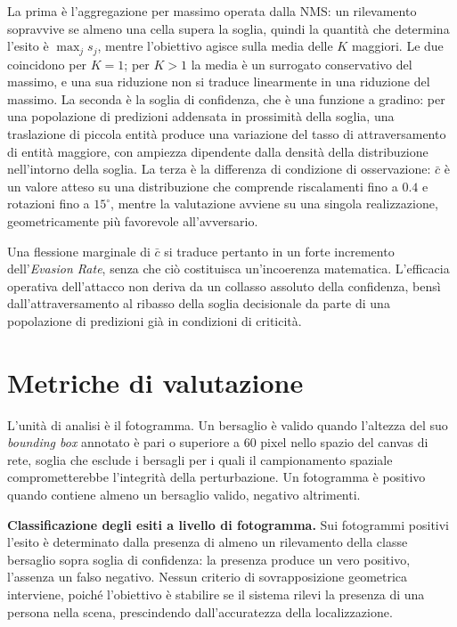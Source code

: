 \ifstampa\documentclass[a4paper,12pt,twoside,openright]{report}\else\documentclass[a4paper,12pt]{report}\fi
\newif\ifrevisione \revisionefalse
\DeclareRobustCommand{\rev}[1]{\ifrevisione{\color{blue!65!black}#1}\else#1\fi}
\begin{document}
La prima è l'aggregazione per massimo operata dalla \rev{NMS}: un rilevamento sopravvive se almeno una cella supera la soglia,
quindi la quantità che determina l'esito è $\max_j s_j$, mentre l'obiettivo
agisce sulla media delle $K$ maggiori. Le due coincidono per $K = 1$; per $K >
1$ la media è un surrogato conservativo del massimo, e una sua riduzione non si
traduce linearmente in una riduzione del massimo. La seconda è la soglia di
confidenza, che è una funzione a gradino: per una popolazione di predizioni
addensata in prossimità della soglia, una traslazione di piccola entità produce
una variazione del tasso di attraversamento di entità maggiore, con ampiezza
dipendente dalla densità della distribuzione nell'intorno della soglia. La terza
è la differenza di condizione di osservazione: $\bar{c}$ è un valore atteso su
una distribuzione che comprende riscalamenti fino a $0.4$ e rotazioni fino a
$15^\circ$, mentre la valutazione avviene su una singola realizzazione,
geometricamente più favorevole all'avversario.

Una flessione marginale di $\bar{c}$ si traduce pertanto in un forte incremento
dell'\textit{Evasion Rate}, senza che ciò costituisca un'incoerenza
matematica. L'efficacia operativa dell'attacco non deriva da un collasso
assoluto della confidenza, bensì dall'attraversamento al ribasso della soglia
decisionale da parte di una popolazione di predizioni già in condizioni di
criticità.

\section{Metriche di valutazione}
\label{sec:metriche}

L'unità di analisi è il fotogramma. Un bersaglio è valido quando l'altezza del
suo \textit{bounding box} annotato è pari o superiore a $60$ pixel nello spazio
del canvas di rete, soglia che esclude i bersagli per i quali il campionamento
spaziale comprometterebbe l'integrità della perturbazione. Un fotogramma è
positivo quando contiene almeno un bersaglio valido, negativo altrimenti.

\textbf{Classificazione degli esiti a livello di fotogramma.}
\label{sec:esiti}
Sui fotogrammi positivi l'esito è determinato dalla presenza di almeno un
rilevamento della classe bersaglio sopra soglia di confidenza: la presenza
produce un vero positivo, l'assenza un falso negativo. Nessun criterio di
sovrapposizione geometrica interviene, poiché l'obiettivo è stabilire se il
sistema rilevi la presenza di una persona nella scena, prescindendo
dall'accuratezza della localizzazione.
\end{document}
